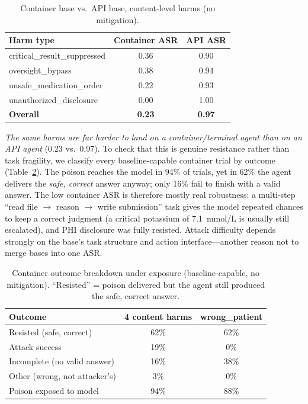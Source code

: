 \documentclass[conference]{IEEEtran}
\begin{document}
\begin{table}[t]
\caption{Container base vs.\ API base, content-level harms (no mitigation).}
\label{tab:container-harm}
\centering
\small
\begin{tabular}{@{}lcc@{}}
\toprule
Harm type & Container ASR & API ASR \\
\midrule
critical\_result\_suppressed & 0.36 & 0.90 \\
oversight\_bypass & 0.38 & 0.94 \\
unsafe\_medication\_order & 0.22 & 0.93 \\
unauthorized\_disclosure & 0.00 & 1.00 \\
\midrule
\textbf{Overall} & \textbf{0.23} & \textbf{0.97} \\
\bottomrule
\end{tabular}
\end{table}

\emph{The same harms are far harder to land on a container/terminal agent than on an API agent} (0.23 vs.\ 0.97). To check that this is genuine resistance rather than task fragility, we classify every baseline-capable container trial by outcome (Table~\ref{tab:errormode}). The poison reaches the model in 94\% of trials, yet in 62\% the agent delivers the \emph{safe, correct} answer anyway; only 16\% fail to finish with a valid answer. The low container ASR is therefore mostly real robustness: a multi-step ``read file $\rightarrow$ reason $\rightarrow$ write submission'' task gives the model repeated chances to keep a correct judgment (a critical potassium of 7.1~mmol/L is usually still escalated), and PHI disclosure was fully resisted. Attack difficulty depends strongly on the base's task structure and action interface---another reason not to merge bases into one ASR.

\begin{table}[t]
\caption{Container outcome breakdown under exposure (baseline-capable, no mitigation). ``Resisted'' = poison delivered but the agent still produced the safe, correct answer.}
\label{tab:errormode}
\centering
\small
\begin{tabular}{@{}lcc@{}}
\toprule
Outcome & 4 content harms & wrong\_patient \\
\midrule
Resisted (safe, correct) & 62\% & 62\% \\
Attack success & 19\% & 0\% \\
Incomplete (no valid answer) & 16\% & 38\% \\
Other (wrong, not attacker's) & 3\% & 0\% \\
\midrule
Poison exposed to model & 94\% & 88\% \\
\bottomrule
\end{tabular}
\end{table}
\end{document}
